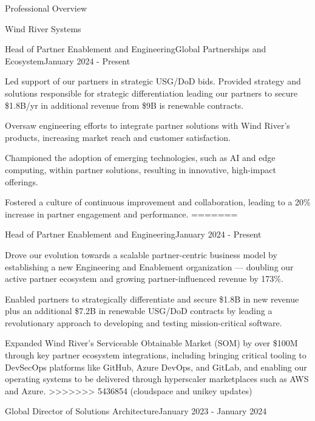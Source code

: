 \documentclass{resume} %
\begin{document}
\begin{rSection}{Professional Overview}
\begin{rCompany}{Wind River Systems}{}{}
\begin{rSubSubsection}{Head of Partner Enablement and Engineering}{Global Partnerships and Ecosystem}{January 2024 - Present}
      \item %
      \item Led support of our partners in strategic USG/DoD bids. Provided strategy and solutions  responsible for strategic differentiation leading our partners to secure \$1.8B/yr in additional revenue from \$9B is renewable contracts.
      \item Oversaw engineering efforts to integrate partner solutions with Wind River's products, increasing market reach and customer satisfaction.
      \item Championed the adoption of emerging technologies, such as AI and edge computing, within partner solutions, resulting in innovative, high-impact offerings.
      \item Fostered a culture of continuous improvement and collaboration, leading to a 20\% increase in partner engagement and performance.
=======
    \begin{rSubSubsection}{Head of Partner Enablement and Engineering}{}{January 2024 - Present}
      \item Drove our evolution towards a scalable partner-centric business model by establishing a new Engineering and Enablement organization --- doubling our active partner ecosystem and growing partner-influenced revenue by 173\%.
      \item Enabled partners to strategically differentiate and secure \$1.8B in new revenue plus an additional \$7.2B in renewable USG/DoD contracts by leading a revolutionary approach to developing and testing mission-critical software.
      \item Expanded Wind River's Serviceable Obtainable Market (SOM) by over \$100M through key partner ecosystem integrations, including bringing critical tooling to DevSecOps platforms like GitHub, Azure DevOps, and GitLab, and enabling our operating systems to be delivered through hyperscaler marketplaces such as AWS and Azure.
>>>>>>> 5436854 (cloudspace and unikey updates)

    \end{rSubSubsection}
    
    \begin{rSubSubsection}{Global Director of Solutions Architecture}{}{January 2023 - January 2024}


\end{rSubSubsection}
\end{rSubSubsection}
\end{rCompany}
\end{rSection}
\end{document}
